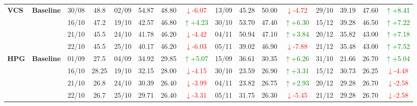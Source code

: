 \documentclass{ieeeaccess}
\begin{document}
{\begin{longtable}{llcc|cccc|cccc|cccc}
\multirow{4}{*}{\textbf{VCS}}
& \textbf{Baseline}
& 30/08 & 48.8 & 02/09 & 54.87 & 48.80 & \textcolor{red}{\(\downarrow\)-6.07} & 13/09 & 45.28 & 50.00 & \textcolor{red}{\(\downarrow\)-4.72} & 29/10 & 39.19 & 47.60 & \textcolor{green}{\(\uparrow\)+8.41} \\
& & 16/10 & 47.2 & 19/10 & 42.57 & 46.80 & \textcolor{green}{\(\uparrow\)+4.23} & 30/10 & 53.70 & 47.40 & \textcolor{green}{\(\uparrow\)+6.30} & 15/12 & 39.28 & 46.50 & \textcolor{green}{\(\uparrow\)+7.22} \\
& & 21/10 & 45.5 & 24/10 & 41.78 & 46.20 & \textcolor{red}{\(\downarrow\)-4.42} & 04/11 & 50.94 & 47.10 & \textcolor{green}{\(\uparrow\)+3.84} & 20/12 & 35.82 & 43.00 & \textcolor{green}{\(\uparrow\)+7.18} \\
& & 22/10 & 45.5 & 25/10 & 40.17 & 46.20 & \textcolor{red}{\(\downarrow\)-6.03} & 05/11 & 39.02 & 46.90 & \textcolor{red}{\(\downarrow\)-7.88} & 21/12 & 35.48 & 43.00 & \textcolor{green}{\(\uparrow\)+7.52} \\
\midrule

\multirow{4}{*}{\textbf{HPG}}
& \textbf{Baseline}
& 01/09 & 27.5 & 04/09 & 34.92 & 29.85 & \textcolor{green}{\(\uparrow\)+5.07} & 15/09 & 36.61 & 30.35 & \textcolor{green}{\(\uparrow\)+6.26} & 31/10 & 21.66 & 26.70 & \textcolor{green}{\(\uparrow\)+5.04} \\
& & 16/10 & 28.25 & 19/10 & 32.15 & 28.00 & \textcolor{red}{\(\downarrow\)-4.15} & 30/10 & 23.59 & 26.90 & \textcolor{green}{\(\uparrow\)+3.31} & 15/12 & 30.73 & 26.25 & \textcolor{red}{\(\downarrow\)-4.48} \\
& & 21/10 & 26.8 & 24/10 & 30.39 & 26.40 & \textcolor{red}{\(\downarrow\)-3.99} & 04/11 & 23.82 & 26.75 & \textcolor{green}{\(\uparrow\)+2.93} & 20/12 & 29.28 & 26.70 & \textcolor{red}{\(\downarrow\)-2.58} \\
& & 22/10 & 26.7 & 25/10 & 29.71 & 26.40 & \textcolor{red}{\(\downarrow\)-3.31} & 05/11 & 31.75 & 26.30 & \textcolor{red}{\(\downarrow\)-5.45} & 21/12 & 29.28 & 26.70 & \textcolor{red}{\(\downarrow\)-2.58} \\
\midrule


\end{longtable}}
\end{document}
